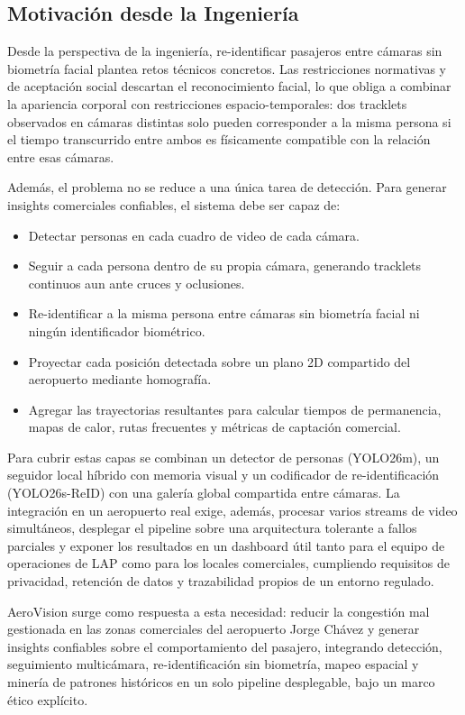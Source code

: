 \documentclass[12pt,letterpaper]{article}
\begin{document}
\subsection{Motivación desde la Ingeniería}

Desde la perspectiva de la ingeniería, re-identificar pasajeros entre
cámaras sin biometría facial plantea retos técnicos concretos. Las
restricciones normativas y de aceptación social descartan el
reconocimiento facial, lo que obliga a combinar la apariencia corporal con
restricciones espacio-temporales: dos tracklets observados en cámaras
distintas solo pueden corresponder a la misma persona si el tiempo
transcurrido entre ambos es físicamente compatible con la relación entre
esas cámaras.

Además, el problema no se reduce a una única tarea de detección. Para
generar insights comerciales confiables, el sistema debe ser capaz de:
\begin{itemize}
    \item Detectar personas en cada cuadro de video de cada cámara.
    \item Seguir a cada persona dentro de su propia cámara, generando
    tracklets continuos aun ante cruces y oclusiones.
    \item Re-identificar a la misma persona entre cámaras sin biometría
    facial ni ningún identificador biométrico.
    \item Proyectar cada posición detectada sobre un plano 2D compartido
    del aeropuerto mediante homografía.
    \item Agregar las trayectorias resultantes para calcular tiempos de
    permanencia, mapas de calor, rutas frecuentes y métricas de
    captación comercial.
\end{itemize}

Para cubrir estas capas se combinan un detector de personas (YOLO26m), un
seguidor local híbrido con memoria visual y un codificador de
re-identificación (YOLO26s-ReID) con una galería global compartida entre
cámaras. La integración en un aeropuerto real exige, además, procesar
varios streams de video simultáneos, desplegar el pipeline sobre una
arquitectura tolerante a fallos parciales y exponer los resultados en un
dashboard útil tanto para el equipo de operaciones de LAP como para los
locales comerciales, cumpliendo requisitos de privacidad, retención de
datos y trazabilidad propios de un entorno regulado.

AeroVision surge como respuesta a esta necesidad: reducir la congestión
mal gestionada en las zonas comerciales del aeropuerto Jorge Chávez y
generar insights confiables sobre el comportamiento del pasajero,
integrando detección, seguimiento multicámara, re-identificación sin
biometría, mapeo espacial y minería de patrones históricos en un solo
pipeline desplegable, bajo un marco ético explícito.
\end{document}
